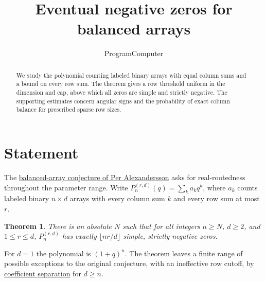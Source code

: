 \documentclass[11pt]{article}
\title{Eventual negative zeros for balanced arrays}
\author{ProgramComputer}
\date{}
\newtheorem{theorem}{Theorem}
\begin{document}
\maketitle

\begin{abstract}
We study the polynomial counting labeled binary arrays with equal column
sums and a bound on every row sum. The theorem gives a row
threshold uniform in the dimension and cap, above which all zeros are
simple and strictly negative. The supporting estimates concern angular
signs and the probability of exact column balance for prescribed sparse
row sizes.
\end{abstract}

\section{Statement}
The \href{https://www.symmetricfunctions.com/realRootedOpenProblems.htm\#conjBalancedArrays}{balanced-array conjecture of Per Alexandersson}
asks for real-rootedness throughout the parameter range. Write
$P_n^{(r,d)}(q)=\sum_k a_kq^k$, where $a_k$ counts labeled binary
$n\times d$ arrays with every column sum $k$ and every row sum at most $r$.

\begin{theorem}
There is an absolute $N$ such that for all integers $n\ge N$, $d\ge2$,
and $1\le r\le d$, $P_n^{(r,d)}$ has exactly $\lfloor nr/d\rfloor$
simple, strictly negative zeros.
\end{theorem}
For $d=1$ the polynomial is $(1+q)^n$. The theorem leaves a
finite range of possible exceptions to the original conjecture, with an ineffective row cutoff, by
\href{https://github.com/ProgramComputer/open-math-research/blob/78e9ef2c0c0b7a5daed126efbe12a46d030d8200/topics/balanced-arrays/orientation-normalization.md}{coefficient separation}
for $d\ge n$.



\appendix
\clearpage






\end{document}
